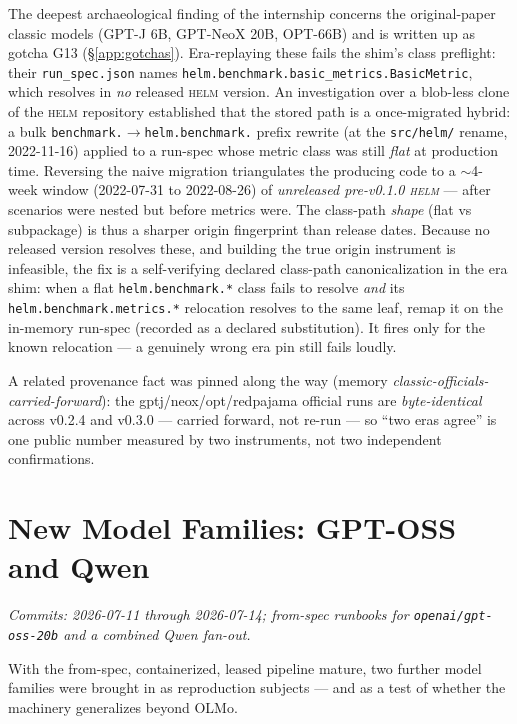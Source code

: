 \documentclass[11pt]{report}
\newcommand{\code}[1]{\texttt{#1}}
\newcommand{\file}[1]{\texttt{#1}}
\begin{document}
The deepest archaeological finding of the internship concerns the original-paper
classic models (GPT-J 6B, GPT-NeoX 20B, OPT-66B) and is written up as gotcha G13
(\S\ref{app:gotchas}). Era-replaying these fails the shim's class preflight: their
\file{run\_spec.json} names \code{helm.benchmark.basic\_metrics.BasicMetric}, which
resolves in \emph{no} released \textsc{helm} version. An investigation over a
blob-less clone of the \textsc{helm} repository established that the stored path is
a once-migrated hybrid: a bulk \code{benchmark.}$\rightarrow$\code{helm.benchmark.}
prefix rewrite (at the \code{src/helm/} rename, 2022-11-16) applied to a run-spec
whose metric class was still \emph{flat} at production time. Reversing the naive
migration triangulates the producing code to a $\sim$4-week window
(2022-07-31 to 2022-08-26) of \emph{unreleased pre-v0.1.0 \textsc{helm}} --- after
scenarios were nested but before metrics were. The class-path \emph{shape} (flat
vs subpackage) is thus a sharper origin fingerprint than release dates. Because no
released version resolves these, and building the true origin instrument is
infeasible, the fix is a self-verifying declared class-path canonicalization in the
era shim: when a flat \code{helm.benchmark.*} class fails to resolve \emph{and} its
\code{helm.benchmark.metrics.*} relocation resolves to the same leaf, remap it on
the in-memory run-spec (recorded as a declared substitution). It fires only for the
known relocation --- a genuinely wrong era pin still fails loudly.

A related provenance fact was pinned along the way (memory
\emph{classic-officials-carried-forward}): the gptj/neox/opt/redpajama official
runs are \emph{byte-identical} across v0.2.4 and v0.3.0 --- carried forward, not
re-run --- so ``two eras agree'' is one public number measured by two instruments,
not two independent confirmations.

\chapter{New Model Families: GPT-OSS and Qwen}
\label{chap:newmodels}

\emph{Commits: 2026-07-11 through 2026-07-14; from-spec runbooks for
\code{openai/gpt-oss-20b} and a combined Qwen fan-out.}

With the from-spec, containerized, leased pipeline mature, two further model
families were brought in as reproduction subjects --- and as a test of whether the
machinery generalizes beyond OLMo.
\end{document}

